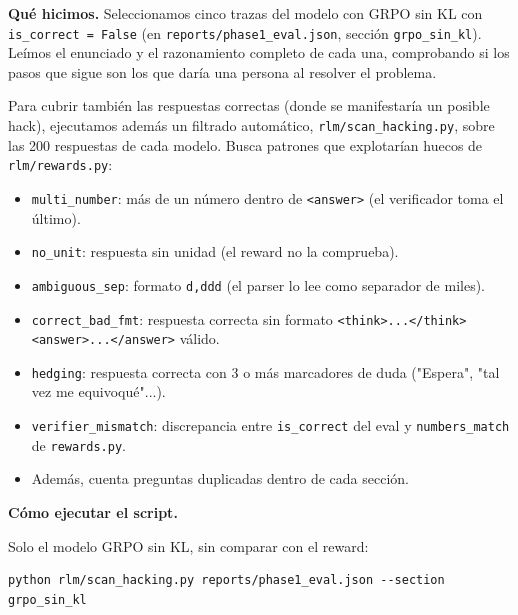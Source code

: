 \textbf{Qué hicimos.} Seleccionamos cinco trazas del modelo con GRPO sin KL con \texttt{is\_\allowbreak{}correct =\allowbreak{} False} (en \texttt{reports/\allowbreak{}phase1\_\allowbreak{}eval.json}, sección \texttt{grpo\_\allowbreak{}sin\_\allowbreak{}kl}). Leímos el enunciado y el razonamiento completo de cada una, comprobando si los pasos que sigue son los que daría una persona al resolver el problema.

Para cubrir también las respuestas correctas (donde se manifestaría un posible hack), ejecutamos además un filtrado automático, \texttt{rlm/\allowbreak{}scan\_\allowbreak{}hacking.py}, sobre las 200 respuestas de cada modelo. Busca patrones que explotarían huecos de \texttt{rlm/\allowbreak{}rewards.py}:

\begin{itemize}
\tightlist
\item
  \texttt{multi\_\allowbreak{}number}: más de un número dentro de \texttt{\textless{}answer\textgreater{}} (el verificador toma el último).
\item
  \texttt{no\_\allowbreak{}unit}: respuesta sin unidad (el reward no la comprueba).
\item
  \texttt{ambiguous\_\allowbreak{}sep}: formato \texttt{d,ddd} (el parser lo lee como separador de miles).
\item
  \texttt{correct\_\allowbreak{}bad\_\allowbreak{}fmt}: respuesta correcta sin formato \texttt{\textless{}think\textgreater{}...\textless{}/\allowbreak{}think\textgreater{}\textless{}answer\textgreater{}...\textless{}/\allowbreak{}answer\textgreater{}} válido.
\item
  \texttt{hedging}: respuesta correcta con 3 o más marcadores de duda ("Espera", "tal vez me equivoqué"...).
\item
  \texttt{verifier\_\allowbreak{}mismatch}: discrepancia entre \texttt{is\_\allowbreak{}correct} del eval y \texttt{numbers\_\allowbreak{}match} de \texttt{rewards.py}.
\item
  Además, cuenta preguntas duplicadas dentro de cada sección.
\end{itemize}

\textbf{Cómo ejecutar el script.}

Solo el modelo GRPO sin KL, sin comparar con el reward:

\begin{lstlisting}
python rlm/scan_hacking.py reports/phase1_eval.json --section grpo_sin_kl
\end{lstlisting}

